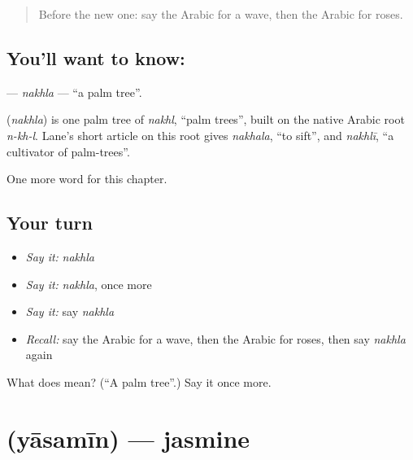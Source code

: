\label{lesson:AR-C247-nakhla}



\begin{quote}
Before the new one: say the Arabic for a wave, then the Arabic for roses.
\end{quote}

\subsection*{You'll want to know: }
\textbf{} — \emph{nakhla} — \textquotedblleft{}a palm tree\textquotedblright{}.

\begin{cousinweb}
\textbf{} (\emph{nakhla}) is one palm tree of \emph{nakhl}, \textquotedblleft{}palm trees\textquotedblright{}, built on the native Arabic root \emph{n-kh-l}. Lane's short article on this root gives \emph{nakhala}, \textquotedblleft{}to sift\textquotedblright{}, and \emph{nakhlī}, \textquotedblleft{}a cultivator of palm-trees\textquotedblright{}.
\end{cousinweb}

\begin{grammarlens}[title={What you've built}]
One more word for this chapter.
\end{grammarlens}

\subsection*{Your turn}
\begin{itemize}
\raggedright
  \item \emph{Say it:} \emph{nakhla}
  \item \emph{Say it:} \emph{nakhla}, once more
  \item \emph{Say it:} say \emph{nakhla}
  \item \emph{Recall:} say the Arabic for a wave, then the Arabic for roses, then say \emph{nakhla} again
\end{itemize}

\begin{tcolorbox}[breakable,colback=teal!4,colframe=teal!35!black,title={Before you move on}]
What does  mean? (\textquotedblleft{}A palm tree\textquotedblright{}.) Say it once more.
\end{tcolorbox}
\section[\texorpdfstring{\ar{ياسمين} (yāsamīn)}{ياسمين (yāsamīn)}]{ (yāsamīn) — jasmine}

